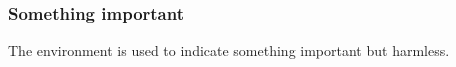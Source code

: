 \documentclass[10pt, a4paper]{article}
\begin{document}

\subsubsection{Something important}

The  environment is used to indicate something important but harmless.

\end{document}
